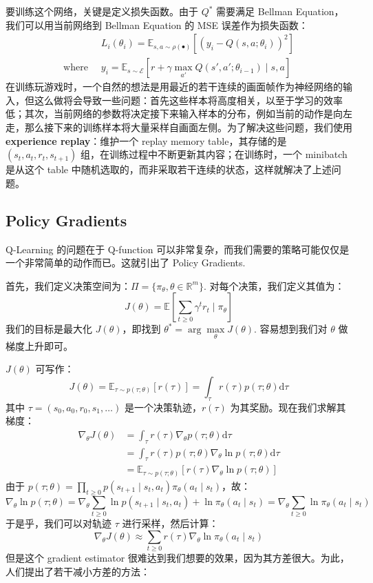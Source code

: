 要训练这个网络，关键是定义损失函数。由于 $Q^*$ 需要满足 Bellman Equation，我们可以用当前网络到 Bellman Equation 的 MSE 误差作为损失函数：
\begin{align*}
&L_i(\theta_i)=\mathbb E_{s,a\sim \rho(\bullet)}\left[(y_i-Q(s,a;\theta_i))^2\right]\\
\text{where}\;\;&y_i=\mathbb E_{s\sim \mathcal{E}}\left[r+\gamma\max_{a'}Q(s',a';\theta_{i-1})\mid s,a\right]
\end{align*}
在训练玩游戏时，一个自然的想法是用最近的若干连续的画面帧作为神经网络的输入，但这么做将会导致一些问题：首先这些样本将高度相关，以至于学习的效率低；其次，当前网络的参数将决定接下来输入样本的分布，例如当前的动作是向左走，那么接下来的训练样本将大量采样自画面左侧。为了解决这些问题，我们使用 \textbf{experience replay}：维护一个 replay memory table，其存储的是 $(s_t,a_t,r_t,s_{t+1})$ 组，在训练过程中不断更新其内容；在训练时，一个 minibatch 是从这个 table 中随机选取的，而非采取若干连续的状态，这样就解决了上述问题。

\subsection{Policy Gradients}

Q-Learning 的问题在于 Q-function 可以非常复杂，而我们需要的策略可能仅仅是一个非常简单的动作而已。这就引出了 Policy Gradients.

首先，我们定义决策空间为：$\Pi=\{\pi_\theta,\theta\in\mathbb R^m\}$. 对每个决策，我们定义其值为：
\[
J(\theta)=\mathbb E\left[\sum_{t\geqslant 0}\gamma^tr_t\mid \pi_\theta\right]
\]
我们的目标是最大化 $J(\theta)$，即找到 $\theta^*=\arg\max\limits_\theta J(\theta)$. 容易想到我们对 $\theta$ 做梯度上升即可。

$J(\theta)$ 可写作：
\[
J(\theta)=\mathbb E_{\tau\sim p(\tau;\theta)}[r(\tau)]=\int_\tau r(\tau)p(\tau;\theta)\mathrm d\tau
\]
其中 $\tau=(s_0,a_0,r_0,s_1,\ldots)$ 是一个决策轨迹，$r(\tau)$ 为其奖励。现在我们求解其梯度：
\begin{align*}
\nabla_\theta J(\theta)&=\int_\tau r(\tau)\nabla_\theta p(\tau;\theta)\mathrm d\tau\\
&=\int_\tau r(\tau) p(\tau;\theta)\nabla_\theta\ln p(\tau;\theta)\mathrm d\tau\\
&=\mathbb E_{\tau\sim p(\tau;\theta)}[r(\tau)\nabla_\theta\ln p(\tau;\theta)]
\end{align*}
由于 $p(\tau;\theta)=\prod\limits_{t\geqslant0}p(s_{t+1}\mid s_t,a_t)\pi_\theta(a_t\mid s_t)$，故：
\[
\nabla_\theta \ln p(\tau;\theta)=\nabla_\theta \sum_{t\geqslant 0}\ln p(s_{t+1}\mid s_t,a_t)+\ln \pi_\theta(a_t\mid s_t)=\nabla_\theta \sum_{t\geqslant 0}\ln\pi_\theta(a_t\mid s_t)
\]
于是乎，我们可以对轨迹 $\tau$ 进行采样，然后计算：
\[
\nabla_\theta J(\theta)\approx\sum_{t\geqslant 0}r(\tau)\nabla_\theta \ln\pi_\theta(a_t\mid s_t)
\]
但是这个 gradient estimator 很难达到我们想要的效果，因为其方差很大。为此，人们提出了若干减小方差的方法：

